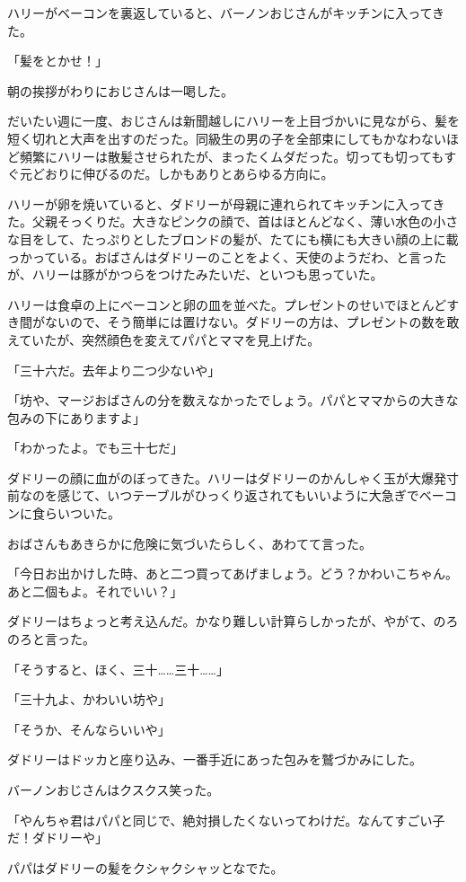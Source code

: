 \documentclass[10pt,a4paper]{article}
\begin{document}
\begin{CJK}{UTF8}{min}
ハリーがベーコンを裏返していると、バーノンおじさんがキッチンに入ってきた。

「髪をとかせ！」

朝の挨拶がわりにおじさんは一喝した。

だいたい週に一度、おじさんは新聞越しにハリーを上目づかいに見ながら、髪を短く切れと大声を出すのだった。同級生の男の子を全部束にしてもかなわないほど頻繁にハリーは散髪させられたが、まったくムダだった。切っても切ってもすぐ元どおりに伸びるのだ。しかもありとあらゆる方向に。

ハリーが卵を焼いていると、ダドリーが母親に連れられてキッチンに入ってきた。父親そっくりだ。大きなピンクの顔で、首はほとんどなく、薄い水色の小さな目をして、たっぷりとしたブロンドの髪が、たてにも横にも大きい顔の上に載っかっている。おばさんはダドリーのことをよく、天使のようだわ、と言ったが、ハリーは豚がかつらをつけたみたいだ、といつも思っていた。

ハリーは食卓の上にべーコンと卵の皿を並べた。プレゼントのせいでほとんどすき間がないので、そう簡単には置けない。ダドリーの方は、プレゼントの数を敢えていたが、突然顔色を変えてパパとママを見上げた。

「三十六だ。去年より二つ少ないや」

「坊や、マージおばさんの分を数えなかったでしょう。パパとママからの大きな包みの下にありますよ」

「わかったよ。でも三十七だ」

ダドリーの顔に血がのぼってきた。ハリーはダドリーのかんしゃく玉が大爆発寸前なのを感じて、いつテーブルがひっくり返されてもいいように大急ぎでベーコンに食らいついた。

おばさんもあきらかに危険に気づいたらしく、あわてて言った。

「今日お出かけした時、あと二つ買ってあげましょう。どう？かわいこちゃん。あと二個もよ。それでいい？」

ダドリーはちょっと考え込んだ。かなり難しい計算らしかったが、やがて、のろのろと言った。

「そうすると、ほく、三十……三十……」

「三十九よ、かわいい坊や」

「そうか、そんならいいや」

ダドリーはドッカと座り込み、一番手近にあった包みを鷲づかみにした。

バーノンおじさんはクスクス笑った。

「やんちゃ君はパパと同じで、絶対損したくないってわけだ。なんてすごい子だ！ダドリーや」

パパはダドリーの髪をクシャクシャッとなでた。


\end{CJK}
\end{document}

